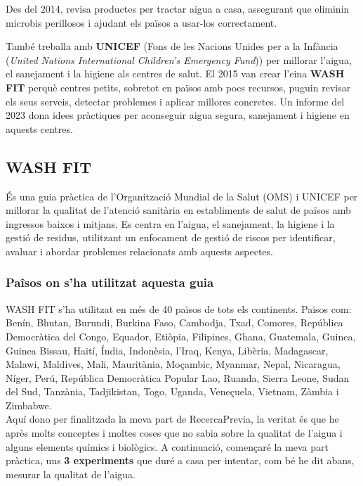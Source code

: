 Des del 2014, revisa productes per tractar aigua a casa, assegurant que eliminin microbis perillosos i ajudant els països a usar-los correctament.

També treballa amb \textbf{UNICEF} (Fons de les Nacions Unides per a la Infància (\textit{United Nations International Children's Emergency Fund})) per millorar l’aigua, el sanejament i la higiene als centres de salut. El 2015 van crear l’eina \textbf{WASH FIT} perquè centres petits, sobretot en països amb pocs recursos, puguin revisar els seus serveis, detectar problemes i aplicar millores concretes. Un informe del 2023 dona idees pràctiques per aconseguir aigua segura, sanejament i higiene en aquests centres.

\subsection{WASH FIT}
És una guia pràctica de l’Organització Mundial de la Salut (OMS) i UNICEF per millorar la qualitat de l’atenció sanitària en establiments de salut de països amb ingressos baixos i mitjans. Es centra en l’aigua, el sanejament, la higiene i la gestió de residus, utilitzant un enfocament de gestió de riscos per identificar, avaluar i abordar problemes relacionats amb aquests aspectes.

\subsubsection{Paîsos on s'ha utilitzat aquesta guia}
WASH FIT s’ha utilitzat en més de 40 països de tots els continents. Països com: \\
Benín, Bhutan, Burundi, Burkina Faso, Cambodja, Txad, Comores, República Democràtica del Congo, Equador, Etiòpia, Filipines, Ghana, Guatemala, Guinea, Guinea Bissau, Haití, Índia, Indonèsia, l’Iraq, Kenya, Libèria, Madagascar, Malawi, Maldives, Mali, Mauritània, Moçambic, Myanmar, Nepal, Nicaragua, Níger, Perú, República Democràtica Popular Lao, Ruanda, Sierra Leone, Sudan del Sud, Tanzània, Tadjikistan, Togo, Uganda, Veneçuela, Vietnam, Zàmbia i Zimbabwe. \\

Aquí dono per finalitzada la meva part de RecercaPrevia, la veritat és que he après molts conceptes i moltes coses que no sabia sobre la qualitat de l’aigua i alguns elements químics i biològics. A continuació, començaré la meva part pràctica, uns \textbf{3 experiments} que duré a casa per intentar, com bé he dit abans, mesurar la qualitat de l’aigua.
